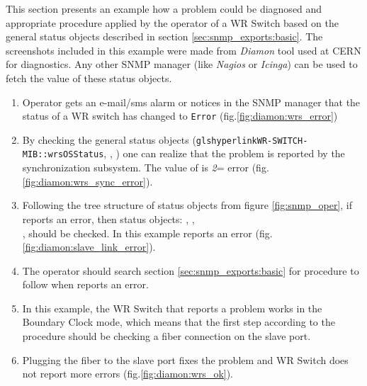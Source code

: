 This section presents an example how a problem could be diagnosed and
appropriate procedure applied by the operator of a WR Switch based on the
general status objects described in section \ref{sec:snmp_exports:basic}. The
screenshots included in this example were made from \emph{Diamon} tool used at
CERN for diagnostics. Any other SNMP manager (like \emph{Nagios} or
\emph{Icinga}) can be used to fetch the value of these status objects.

\begin{enumerate}
  \item Operator gets an e-mail/sms alarm or notices in the SNMP manager that
    the status of a WR switch has changed to \texttt{Error}
    (fig.\ref{fig:diamon:wrs_error})
  \item By checking the general status objects
    (\texttt{glshyperlink{WR-SWITCH-MIB::wrsOSStatus}},
    \texttt{},
    \texttt{}) one can realize
    that the problem is reported by the synchronization subsystem. The value of
    \texttt{} is \emph{2}= error
    (fig.\ref{fig:diamon:wrs_sync_error}).
  \item Following the tree structure of status objects from figure
    \ref{fig:snmp_oper}, if
    \texttt{} reports an error,
    then status objects: \texttt{},
    \texttt{},\\
    \texttt{},
    \texttt{} should be
    checked. In this example
    \texttt{} reports an error
    (fig.\ref{fig:diamon:slave_link_error}).
  \item The operator should search section \ref{sec:snmp_exports:basic} for
    procedure to follow when
    \texttt{} reports an error.
  \item In this example, the WR Switch that reports a problem works in the
    Boundary Clock mode, which means that the first step according to the
    procedure should be checking a fiber connection on the slave port.
  \item Plugging the fiber to the slave port fixes the problem and WR Switch
    does not report more errors (fig.\ref{fig:diamon:wrs_ok}).
\end{enumerate}

